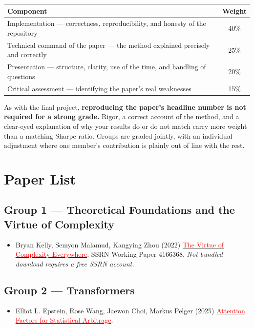 \documentclass[11pt]{article}
\newcommand{\paper}[2]{\href{#2}{\textcolor{red}{#1}}}
\begin{document}
\begin{center}
\begin{tabular}{@{}p{7.4cm}c@{}}
\toprule
\textbf{Component} & \textbf{Weight} \\
\midrule
Implementation --- correctness, reproducibility, and honesty of the repository & 40\% \\
Technical command of the paper --- the method explained precisely and correctly & 25\% \\
Presentation --- structure, clarity, use of the time, and handling of questions & 20\% \\
Critical assessment --- identifying the paper's real weaknesses & 15\% \\
\bottomrule
\end{tabular}
\end{center}

\noindent
As with the final project, \textbf{reproducing the paper's headline number is
not required for a strong grade.} Rigor, a correct account of the method, and a
clear-eyed explanation of why your results do or do not match carry more weight
than a matching Sharpe ratio. Groups are graded jointly, with an individual
adjustment where one member's contribution is plainly out of line with the rest.

\section*{Paper List}

\subsection*{Group 1 --- Theoretical Foundations and the Virtue of Complexity}

\begin{itemize}
  \item Bryan Kelly, Semyon Malamud, Kangying Zhou (2022) \paper{The Virtue of
    Complexity Everywhere}{https://papers.ssrn.com/sol3/papers.cfm?abstract_id=4166368},
    SSRN Working Paper 4166368. \emph{Not bundled --- download requires a free
    SSRN account.}
\end{itemize}

\subsection*{Group 2 --- Transformers}

\begin{itemize}
  \item Elliot L. Epstein, Rose Wang, Jaewon Choi, Markus
    Pelger (2025) \paper{Attention Factors for Statistical
    Arbitrage}{https://arxiv.org/pdf/2510.11616}.
\end{itemize}
\end{document}
